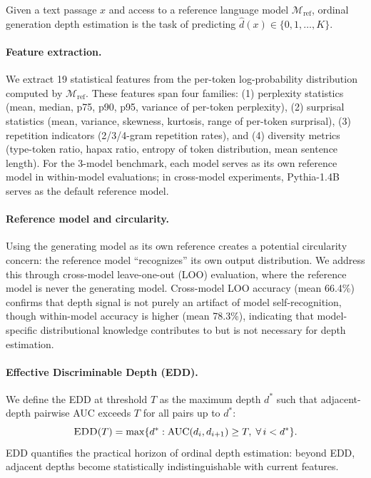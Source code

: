 \documentclass[11pt,a4paper]{article}
\newcommand{\edd}{\textsc{EDD}}
\begin{document}
Given a text passage $x$ and access to a reference language model $\mathcal{M}_{\mathrm{ref}}$, ordinal generation depth estimation is the task of predicting $\hat{d}(x) \in \{0, 1, \ldots, K\}$.

\paragraph{Feature extraction.}
We extract 19 statistical features from the per-token log-probability distribution computed by $\mathcal{M}_{\mathrm{ref}}$. These features span four families: (1) perplexity statistics (mean, median, p75, p90, p95, variance of per-token perplexity), (2) surprisal statistics (mean, variance, skewness, kurtosis, range of per-token surprisal), (3) repetition indicators (2/3/4-gram repetition rates), and (4) diversity metrics (type-token ratio, hapax ratio, entropy of token distribution, mean sentence length). For the 3-model benchmark, each model serves as its own reference model in within-model evaluations; in cross-model experiments, Pythia-1.4B serves as the default reference model.

\paragraph{Reference model and circularity.}
Using the generating model as its own reference creates a potential circularity concern: the reference model ``recognizes'' its own output distribution. We address this through cross-model leave-one-out (LOO) evaluation, where the reference model is never the generating model. Cross-model LOO accuracy (mean 66.4\%) confirms that depth signal is not purely an artifact of model self-recognition, though within-model accuracy is higher (mean 78.3\%), indicating that model-specific distributional knowledge contributes to but is not necessary for depth estimation.

\paragraph{Effective Discriminable Depth (\edd).}
We define the \edd{} at threshold $T$ as the maximum depth $d^*$ such that adjacent-depth pairwise AUC exceeds $T$ for all pairs up to $d^*$:
\begin{equation}
    \edd(T) = \max \{ d^* : \mathrm{AUC}(d_i, d_{i+1}) \geq T, \; \forall \, i < d^* \}.
\end{equation}
\edd{} quantifies the practical horizon of ordinal depth estimation: beyond \edd, adjacent depths become statistically indistinguishable with current features.
\end{document}
